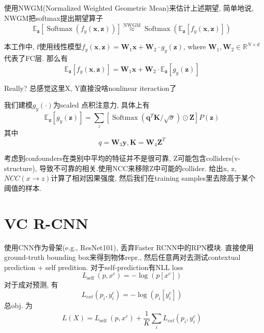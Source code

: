 \documentclass{article}
\begin{document}
使用NWGM(Normalized Weighted Geometric Mean)来估计上述期望, 简单地说, NWGM把softmax提出期望算子
\begin{equation}
    \mathbb{E}_{\boldsymbol{z}}\left[\operatorname{Softmax}\left(f_{y}(\boldsymbol{x}, \boldsymbol{z})\right)\right] \stackrel{\mathrm{NWGM}}{\approx} \operatorname{Softmax}\left(\mathbb{E}_{\boldsymbol{z}}\left[f_{y}(\boldsymbol{x}, \boldsymbol{z})\right]\right)
\end{equation}

本工作中, f使用线性模型$f_{y}(\boldsymbol{x}, \boldsymbol{z})=\boldsymbol{W}_{1} \boldsymbol{x}+\boldsymbol{W}_{2} \cdot g_{y}(\boldsymbol{z})$, where $\boldsymbol{W}_{1}, \boldsymbol{W}_{2} \in \mathbb{R}^{N \times d}$代表了FC层. 那么有
\begin{equation}
    \mathbb{E}_{\boldsymbol{z}}\left[f_{y}(\boldsymbol{x}, \boldsymbol{z})\right]=\boldsymbol{W}_{1} \boldsymbol{x}+\boldsymbol{W}_{2} \cdot \mathbb{E}_{\boldsymbol{z}}\left[g_{y}(\boldsymbol{z})\right]
\end{equation}

\begin{remark}
    Really? 总感觉这里X, Y直接没啥nonlinear iteraction了
\end{remark}

我们建模$g_{y}(\cdot)$为scaled 点积注意力, 具体上有
\begin{equation}
    \mathbb{E}_{\boldsymbol{z}}\left[g_{y}(\boldsymbol{z})\right]=\sum_{z}\left[\operatorname{Softmax}\left(\boldsymbol{q}^{T} \boldsymbol{K} / \sqrt{\sigma}\right) \odot \boldsymbol{Z}\right] P(\boldsymbol{z})
\end{equation}
其中
\begin{equation}
    q=\boldsymbol{W}_{3} \boldsymbol{y}, \boldsymbol{K}=\boldsymbol{W}_{4} \boldsymbol{Z}^{T}
\end{equation}

考虑到confounders在类别中平均的特征并不是很可靠, Z可能包含colliders(v-structure), 导致不可靠的相关.使用NCC来移除Z中可能的collider. 给出x, z, $NCC(x\to z)$计算了相对因果强度, 然后我们在training samples里去除高于某个阈值的样本.

\section{VC R-CNN}

使用CNN作为骨架(e.g., ResNet101), 丢弃Faster RCNN中的RPN模块. 直接使用ground-truth bounding box来得到物体repr., 然后任意两对去测试contextual prediction + self predition. 对于self-prediction有NLL loss
\begin{equation}
    L_{\text {self }}\left(p, x^{c}\right)=-\log \left(p\left[x^{c}\right]\right)
\end{equation}
对于成对预测, 有
\begin{equation}
    L_{c x t}\left(p_{i}, y_{i}^{c}\right)=-\log \left(p_{i}\left[y_{i}^{c}\right]\right)
\end{equation}
总obj. 为
\begin{equation}
    L(X)=L_{\text {self }}\left(p, x^{c}\right)+\frac{1}{K} \sum_{i} L_{c x l}\left(p_{i}, y_{i}^{c}\right)
\end{equation}
\end{document}
